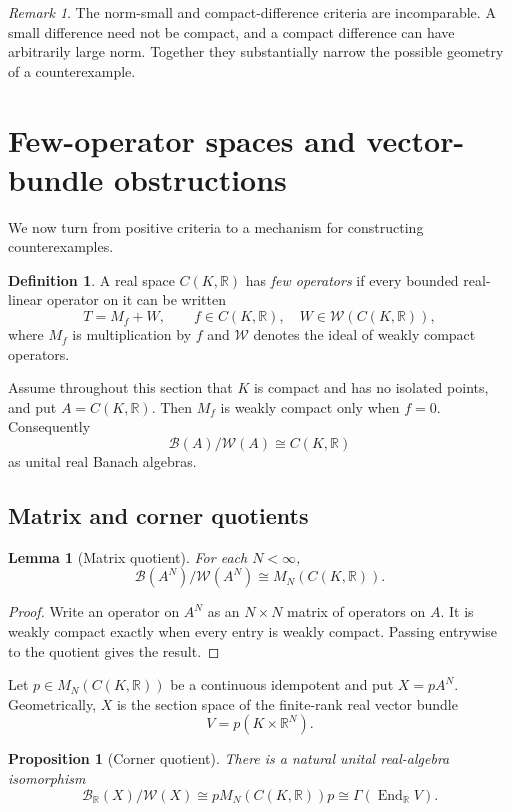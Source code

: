 \documentclass[11pt]{article}
\newtheorem{proposition}[theorem]{Proposition}
\newtheorem{lemma}[theorem]{Lemma}
\theoremstyle{definition}
\newtheorem{definition}[theorem]{Definition}
\theoremstyle{remark}
\newtheorem{remark}[theorem]{Remark}
\newcommand{\R}{\mathbb R}
\newcommand{\cW}{\mathcal W}
\newcommand{\cB}{\mathcal B}
\newcommand{\End}{\operatorname{End}}
\begin{document}
\begin{remark}
The norm-small and compact-difference criteria are incomparable. A small difference need not be compact, and a compact difference can have arbitrarily large norm. Together they substantially narrow the possible geometry of a counterexample.
\end{remark}

\section{Few-operator spaces and vector-bundle obstructions}

We now turn from positive criteria to a mechanism for constructing counterexamples.

\begin{definition}
A real space $C(K,\R)$ has \emph{few operators} if every bounded real-linear operator on it can be written
\[
       T=M_f+W,
       \qquad f\in C(K,\R),\quad W\in\cW(C(K,\R)),
\]
where $M_f$ is multiplication by $f$ and $\cW$ denotes the ideal of weakly compact operators.
\end{definition}

Assume throughout this section that $K$ is compact and has no isolated points, and put $A=C(K,\R)$. Then $M_f$ is weakly compact only when $f=0$. Consequently
\[
       \cB(A)/\cW(A)\cong C(K,\R)
\]
as unital real Banach algebras.

\subsection{Matrix and corner quotients}

\begin{lemma}[Matrix quotient]\label{lem:matrix-quotient}
For each $N<\infty$,
\[
 \cB(A^N)/\cW(A^N)\cong M_N(C(K,\R)).
\]
\end{lemma}

\begin{proof}
Write an operator on $A^N$ as an $N\times N$ matrix of operators on $A$. It is weakly compact exactly when every entry is weakly compact. Passing entrywise to the quotient gives the result.
\end{proof}

Let $p\in M_N(C(K,\R))$ be a continuous idempotent and put $X=pA^N$. Geometrically, $X$ is the section space of the finite-rank real vector bundle
\[
       V=p(K\times\R^N).
\]

\begin{proposition}[Corner quotient]\label{prop:corner-quotient}
There is a natural unital real-algebra isomorphism
\[
 \cB_{\R}(X)/\cW(X)
     \cong pM_N(C(K,\R))p
     \cong \Gamma(\End_{\R}V).
\]
\end{proposition}
\end{document}
